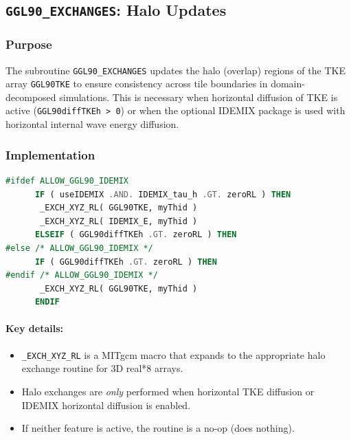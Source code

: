 \documentclass[12pt,letterpaper]{article}
\begin{document}
\subsection{\texttt{GGL90\_EXCHANGES}: Halo Updates}
\label{sec:exchanges}

\subsubsection{Purpose}

The subroutine \verb|GGL90_EXCHANGES| updates the halo (overlap) regions of the TKE array \verb|GGL90TKE| to ensure consistency across tile boundaries in domain-decomposed simulations. This is necessary when horizontal diffusion of TKE is active (\verb|GGL90diffTKEh > 0|) or when the optional IDEMIX package is used with horizontal internal wave energy diffusion.

\subsubsection{Implementation}

\begin{lstlisting}[language=Fortran,caption={(ggl90\_exchanges.F:L31--40) Conditional halo exchanges}]
#ifdef ALLOW_GGL90_IDEMIX
      IF ( useIDEMIX .AND. IDEMIX_tau_h .GT. zeroRL ) THEN
       _EXCH_XYZ_RL( GGL90TKE, myThid )
       _EXCH_XYZ_RL( IDEMIX_E, myThid )
      ELSEIF ( GGL90diffTKEh .GT. zeroRL ) THEN
#else /* ALLOW_GGL90_IDEMIX */
      IF ( GGL90diffTKEh .GT. zeroRL ) THEN
#endif /* ALLOW_GGL90_IDEMIX */
       _EXCH_XYZ_RL( GGL90TKE, myThid )
      ENDIF
\end{lstlisting}

\paragraph{Key details:}
\begin{itemize}
\item \verb|_EXCH_XYZ_RL| is a MITgcm macro that expands to the appropriate halo exchange routine for 3D real*8 arrays.
\item Halo exchanges are \emph{only} performed when horizontal TKE diffusion or IDEMIX horizontal diffusion is enabled.
\item If neither feature is active, the routine is a no-op (does nothing).
\end{itemize}
\end{document}
